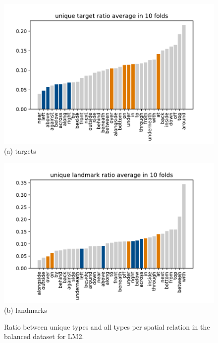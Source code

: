 \begin{figure}[htbp]
	\centering
  \begin{minipage}{.5\linewidth}
    \centering
    \hspace*{-1.2em}\includegraphics[width=1.12\columnwidth]{studies/splu2018/figures/train_unique_ratio-targets-avg.pdf} \\
    (a) targets
  \end{minipage}%
  \begin{minipage}{.5\linewidth}
    \centering
    \hspace*{-1.em}\includegraphics[width=1.12\columnwidth]{studies/splu2018/figures/train_unique_ratio-landmarks-avg.pdf} \\
    (b) landmarks
  \end{minipage}%
  \caption{Ratio between unique types and all types per spatial relation in the balanced dataset for LM2.}\label{splu2018:fig:unique-in-plain-balanced}
\end{figure}



